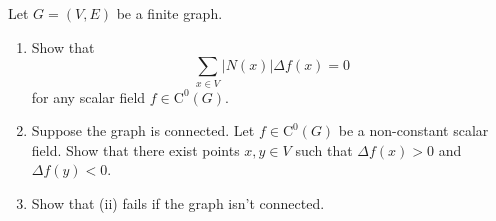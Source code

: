 \documentclass[12 pt, letterpaper]{hmcpset}
\begin{document}
\begin{problem}[34.]
	Let $G = (V, E)$ be a finite graph.
	\begin{enumerate}
		\item Show that
			\[
				\sum_{x \in V} \lvert N(x) \rvert \Delta f(x) = 0
			\]
			for any scalar field $f \in \mathrm{C}^{0}(G)$.

		\item Suppose the graph is connected. Let $f \in \mathrm{C}^{0}(G)$ be a non-constant scalar field. Show that there exist points $x, y \in V$ such that $\Delta f(x) > 0$ and $\Delta f(y) < 0$.

		\item Show that (ii) fails if the graph isn't connected.
	\end{enumerate}
\end{problem}
\end{document}

